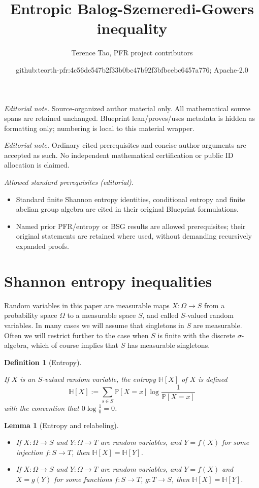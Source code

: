 \documentclass[10pt,a4paper]{article}
\title{Entropic Balog-Szemeredi-Gowers inequality}
\author{Terence Tao, PFR project contributors}
\date{github:teorth-pfr:4c56de547b2f33b0bc47b92f3bfbcebc6457a776; Apache-2.0}
\newtheorem{lemma}[theorem]{Lemma}
\newtheorem{definition}[theorem]{Definition}
\newcommand{\lean}[1]{}
\newcommand{\uses}[1]{}
\newcommand{\leanok}{}
\newcommand{\chapter}[1]{\section{#1}}
\newcommand{\bbH}{\mathbb{H}}
\newcommand{\bbP}{\mathbb{P}}
\begin{document}
\maketitle
\noindent\textit{Editorial note.} Source-organized author material only. All mathematical source spans are retained unchanged. Blueprint lean/proves/uses metadata is hidden as formatting only; numbering is local to this material wrapper.\par\medskip
\noindent\textit{Editorial note.} Ordinary cited prerequisites and concise author arguments are accepted as such. No independent mathematical certification or public ID allocation is claimed.\par\medskip
\noindent\textit{Allowed standard prerequisites (editorial).}\begin{itemize}
\item Standard finite Shannon entropy identities, conditional entropy and finite abelian group algebra are cited in their original Blueprint formulations.
\item Named prior PFR/entropy or BSG results are allowed prerequisites; their original statements are retained where used, without demanding recursively expanded proofs.
\end{itemize}\medskip
\chapter{Shannon entropy inequalities}

Random variables in this paper are measurable maps $X : \Omega \to S$ from a probability space $\Omega$ to a measurable space $S$, and called $S$-valued random variables. In many cases we will assume that singletons in $S$ are measurable.  Often we will restrict further to the case when $S$ is finite with the discrete $\sigma$-algebra, which of course implies that $S$ has measurable singletons.

\begin{definition}[Entropy]
  \label{entropy-def}
  \lean{ProbabilityTheory.entropy}
  \leanok
  If $X$ is an $S$-valued random variable, the entropy $\bbH[X]$ of $X$ is defined
  $$ \bbH[X] := \sum_{s \in S} \bbP[X=x] \log \frac{1}{\bbP[X=x]}$$
  with the convention that $0 \log \frac{1}{0} = 0$.
\end{definition}

\begin{lemma}[Entropy and relabeling]\label{relabeled-entropy}\lean{ProbabilityTheory.entropy_comp_of_injective, ProbabilityTheory.entropy_of_comp_eq_of_comp} \uses{entropy-def}\leanok
  \begin{itemize}
\item[(i)]   If $X: \Omega \to S$ and $Y: \Omega \to T$ are random variables, and $Y = f(X)$ for some injection $f: S \to T$, then $\bbH[X] = \bbH[Y]$.
\item[(ii)]   If $X: \Omega \to S$ and $Y: \Omega \to T$ are random variables, and $Y = f(X)$ and $X = g(Y)$ for some functions $f: S \to T$, $g: T \to S$, then $\bbH[X] = \bbH[Y]$.
\end{itemize}
\end{lemma}
\end{document}
